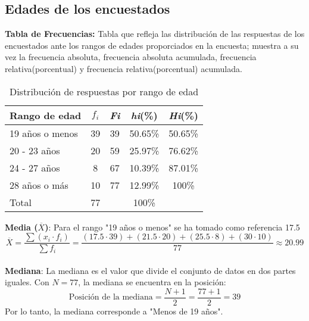 \subsection{Edades de los encuestados}
	\noindent \textbf{Tabla de Frecuencias:} 
	Tabla que refleja las distribución de las respuestas de los encuestados ante los rangos de edades proporciados en la encuesta; muestra a su vez la frecuencia absoluta, frecuencia absoluta acumulada, frecuencia relativa(porcentual) y frecuencia relativa(porcentual) acumulada.
	
	\begin{table}[h!]
		\centering
		\renewcommand{\arraystretch}{1.2} %
		\begin{tabular}{l c c c c}
			\hline
			{Rango de edad} & {\(f_i\)} & \textit{Fi} & \textit{hi}(\%) & \textit{Hi}(\%)\\
			\hline
			19 años o menos   & 39 & 39 & 50.65\% & 50.65\%\\
			20 - 23 años       & 20 & 59 & 25.97\% & 76.62\%\\
			24 - 27 años       & 8  & 67 & 10.39\% & 87.01\%\\
			28 años o más      & 10 & 77 & 12.99\% & 100\%\\
			\hline
			Total			   & 77 & & 100\% \\
			\hline
		\end{tabular}
		\caption{Distribución de respuestas por rango de edad}
		\label{tabla:edad}
	\end{table}
	\noindent \textbf{Media (\(\overline{X}\))}: Para el rango "19 años o menos" se ha tomado como referencia 17.5
	\begin{equation*}
		\overline{X} = \frac{\sum (x_i \cdot f_i)}{\sum f_i} = \frac{(17.5 \cdot 39) + (21.5 \cdot 20) + (25.5 \cdot 8) + (30 \cdot 10)}{77} \approx 20.99
	\end{equation*}\\
	
	\noindent \textbf{Mediana}: La mediana es el valor que divide el conjunto de datos en dos partes iguales. Con \(N = 77\), la mediana se encuentra en la posición:
	\begin{equation*}
		\text{Posición de la mediana} = \frac{N + 1}{2} = \frac{77 + 1}{2} = 39
	\end{equation*}
	Por lo tanto, la mediana corresponde a "Menos de 19 años".
	
